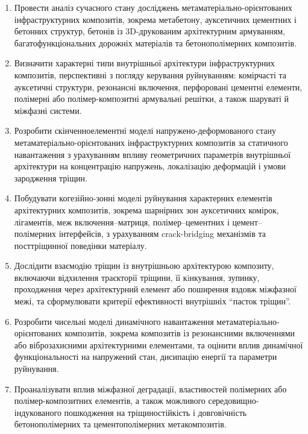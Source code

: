 \documentclass[12pt,a4paper]{article}
\begin{document}
\begin{enumerate}
	\item Провести аналіз сучасного стану досліджень метаматеріально-орієнтованих інфраструктурних композитів, зокрема метабетону, ауксетичних цементних і бетонних структур, бетонів із 3D-друкованим архітектурним армуванням, багатофункціональних дорожніх матеріалів та бетонополімерних композитів.
	
	\item Визначити характерні типи внутрішньої архітектури інфраструктурних композитів, перспективні з погляду керування руйнуванням: комірчасті та ауксетичні структури, резонансні включення, перфоровані цементні елементи, полімерні або полімер-композитні армувальні решітки, а також шаруваті й міжфазні системи.
	
	\item Розробити скінченноелементні моделі напружено-деформованого стану метаматеріально-орієнтованих інфраструктурних композитів за статичного навантаження з урахуванням впливу геометричних параметрів внутрішньої архітектури на концентрацію напружень, локалізацію деформацій і умови зародження тріщин.
	
	\item Побудувати когезійно-зонні моделі руйнування характерних елементів архітектурних композитів, зокрема шарнірних зон ауксетичних комірок, лігаментів, меж включення--матриця, полімер--цементних і цемент--полімерних інтерфейсів, з урахуванням crack-bridging механізмів та посттріщинної поведінки матеріалу.
	
	\item Дослідити взаємодію тріщин із внутрішньою архітектурою композиту, включаючи відхилення траєкторії тріщини, її кiнкування, зупинку, проходження через архітектурний елемент або поширення вздовж міжфазної межі, та сформулювати критерії ефективності внутрішніх ``пасток тріщин''.
	
	\item Розробити чисельні моделі динамічного навантаження метаматеріально-орієнтованих композитів, зокрема композитів із резонансними включеннями або віброзахисними архітектурними елементами, та оцінити вплив динамічної функціональності на напружений стан, дисипацію енергії та параметри руйнування.
	
	\item Проаналізувати вплив міжфазної деградації, властивостей полімерних або полімер-композитних елементів, а також можливого середовищно-індукованого пошкодження на тріщиностійкість і довговічність бетонополімерних та цементополімерних метакомпозитів.
	

\end{enumerate}
\end{document}
